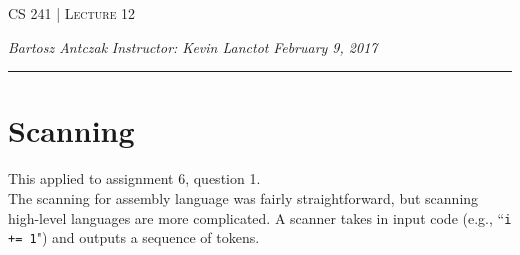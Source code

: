 \documentclass{report}
\newcommand{\lectureNum}{12}
\newcommand{\curDate}{February 9, 2017}
\newcommand{\course}{CS 241}
\newcommand{\instructor}{Kevin Lanctot}
\begin{document}
\begin{center}
\begin{Large}
\textsc{\course{} | Lecture \lectureNum{}}
\end{Large}
\end{center} 
\noindent \textit{Bartosz Antczak} \hfill
\textit{Instructor: \instructor{}} \hfill
\textit{\curDate{}}
\rule{\textwidth}{0.4pt}
\section{Scanning}
This applied to assignment 6, question 1.\\
The scanning for assembly language was fairly straightforward, but scanning high-level languages are more complicated. A scanner takes in input code (e.g., ``\texttt{i += 1}") and outputs a sequence of tokens.
\end{document}
